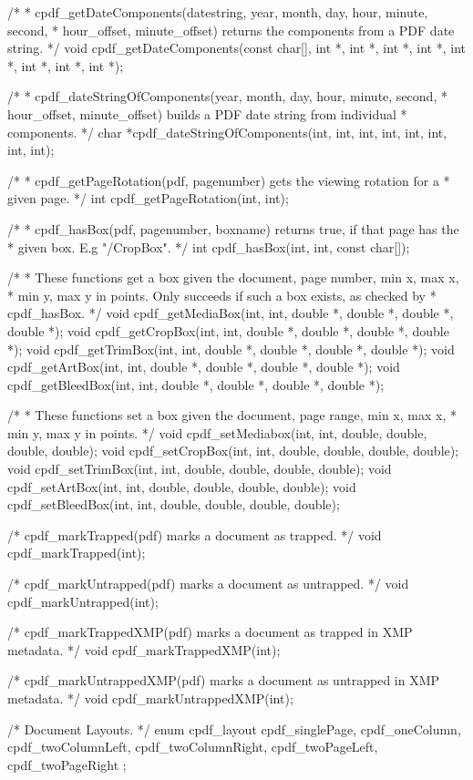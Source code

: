 /*
 * cpdf_getDateComponents(datestring, year, month, day, hour, minute, second,
 * hour_offset, minute_offset) returns the components from a PDF date string.
 */
void cpdf_getDateComponents(const char[], int *, int *, int *, int *, int *,
                            int *, int *, int *);

/*
 * cpdf_dateStringOfComponents(year, month, day, hour, minute, second,
 * hour_offset, minute_offset) builds a PDF date string from individual
 * components.
 */
char *cpdf_dateStringOfComponents(int, int, int, int, int, int, int, int);

/*
 * cpdf_getPageRotation(pdf, pagenumber) gets the viewing rotation for a
 * given page.
 */
int cpdf_getPageRotation(int, int);

/*
 * cpdf_hasBox(pdf, pagenumber, boxname) returns true, if that page has the
 * given box. E.g "/CropBox".
 */
int cpdf_hasBox(int, int, const char[]);

/*
 * These functions get a box given the document, page number, min x, max x,
 * min y, max y in points. Only succeeds if such a box exists, as checked by
 * cpdf_hasBox.
 */
void cpdf_getMediaBox(int, int, double *, double *, double *, double *);
void cpdf_getCropBox(int, int, double *, double *, double *, double *);
void cpdf_getTrimBox(int, int, double *, double *, double *, double *);
void cpdf_getArtBox(int, int, double *, double *, double *, double *);
void cpdf_getBleedBox(int, int, double *, double *, double *, double *);

/*
 * These functions set a box given the document, page range, min x, max x,
 * min y, max y in points.
 */
void cpdf_setMediabox(int, int, double, double, double, double);
void cpdf_setCropBox(int, int, double, double, double, double);
void cpdf_setTrimBox(int, int, double, double, double, double);
void cpdf_setArtBox(int, int, double, double, double, double);
void cpdf_setBleedBox(int, int, double, double, double, double);

/* cpdf_markTrapped(pdf) marks a document as trapped. */
void cpdf_markTrapped(int);

/* cpdf_markUntrapped(pdf) marks a document as untrapped. */
void cpdf_markUntrapped(int);

/* cpdf_markTrappedXMP(pdf) marks a document as trapped in XMP metadata. */
void cpdf_markTrappedXMP(int);

/* cpdf_markUntrappedXMP(pdf) marks a document as untrapped in XMP metadata. */
void cpdf_markUntrappedXMP(int);

/* Document Layouts. */
enum cpdf_layout {
  cpdf_singlePage,
  cpdf_oneColumn,
  cpdf_twoColumnLeft,
  cpdf_twoColumnRight,
  cpdf_twoPageLeft,
  cpdf_twoPageRight
};

